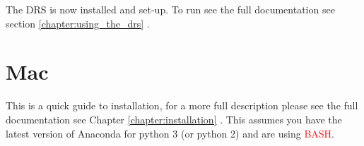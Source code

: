 The DRS is now installed and set-up. To run \ifquickguide see the full documentation \else see section \ref{chapter:using_the_drs} \fi.








\section{Mac}
\label{chapter:quickinstallation:mac}

\noindent This is a quick guide to installation, for a more full description please \ifquickguide see the full documentation \else see Chapter \ref{chapter:installation} \fi. This assumes you have the latest version of Anaconda for python 3 (or python 2) and are using \textcolor{red}{BASH}.


